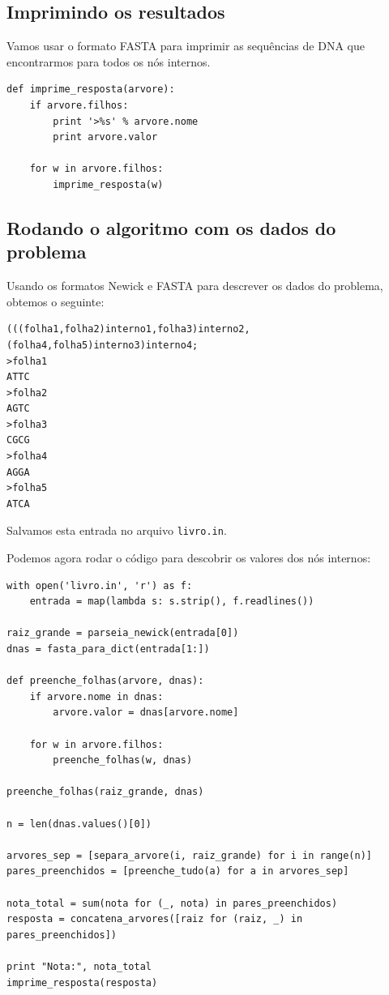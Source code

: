\documentclass[11pt]{article}
\begin{document}
\subsection{Imprimindo os resultados}
\label{sec-3-4}

Vamos usar o formato FASTA para imprimir as sequências de DNA que
encontrarmos para todos os nós internos.

\begin{verbatim}
def imprime_resposta(arvore):
    if arvore.filhos:
        print '>%s' % arvore.nome
        print arvore.valor

    for w in arvore.filhos:
        imprime_resposta(w)
\end{verbatim}


\subsection{Rodando o algoritmo com os dados do problema}
\label{sec-3-5}

Usando os formatos Newick e FASTA para descrever os dados do problema,
obtemos o seguinte:

\begin{verbatim}
(((folha1,folha2)interno1,folha3)interno2,(folha4,folha5)interno3)interno4;
>folha1
ATTC
>folha2
AGTC
>folha3
CGCG
>folha4
AGGA
>folha5
ATCA
\end{verbatim}

Salvamos esta entrada no arquivo \verb~livro.in~.

Podemos agora rodar o código para descobrir os valores dos nós internos:

\begin{verbatim}
with open('livro.in', 'r') as f:
    entrada = map(lambda s: s.strip(), f.readlines())

raiz_grande = parseia_newick(entrada[0])
dnas = fasta_para_dict(entrada[1:])

def preenche_folhas(arvore, dnas):
    if arvore.nome in dnas:
        arvore.valor = dnas[arvore.nome]

    for w in arvore.filhos:
        preenche_folhas(w, dnas)

preenche_folhas(raiz_grande, dnas)

n = len(dnas.values()[0])

arvores_sep = [separa_arvore(i, raiz_grande) for i in range(n)]
pares_preenchidos = [preenche_tudo(a) for a in arvores_sep]

nota_total = sum(nota for (_, nota) in pares_preenchidos)
resposta = concatena_arvores([raiz for (raiz, _) in pares_preenchidos])

print "Nota:", nota_total
imprime_resposta(resposta)
\end{verbatim}
\end{document}
